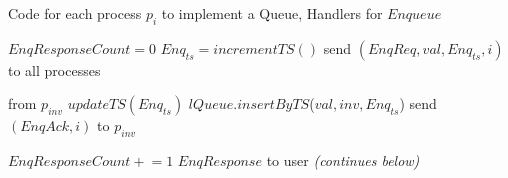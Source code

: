 \documentclass[a4paper,anonymous,USenglish]{lipics-v2021} %
\theoremstyle{definition}
\newcommand{\pluseq}{\mathrel{+}=}
\begin{document}
\begin{algorithm}
  \caption{Code for each process $p_i$ to implement a Queue, Handlers for $Enqueue$}\label{alg:fifo}
  \begin{algorithmic}[1]
    \label{fifoline:invEnq}
      \State $EnqResponseCount = 0$ 
      \State $Enq_{ts} = incrementTS()$ \label{fifoline:enqTS} 
      \State send $(EnqReq, val, Enq_{ts}, i)$ to all processes\label{fifoline:sendEnqReq}
    \EndFunction

     from $p_{inv}$
      \State $updateTS(Enq_{ts})$ \label{fifoline:enqReqTSUpdate} 
      \State $lQueue.insertByTS$($val, inv, Enq_{ts}$)\label{fifoline:executeEnq} 
      \State send $(EnqAck, i)$ to $p_{inv}$ \label{fifoline:sendEnqAck} 
    \EndFunction

      \State $EnqResponseCount \pluseq 1$
        \Return $EnqResponse$ to user\label{fifoline:enqReturn} 
      \EndIf
    \EndFunction \label{fifoline:finishEnq}
    \Statex
    \Statex \emph{(continues below)}
  \end{algorithmic}
\end{algorithm}
\end{document}

